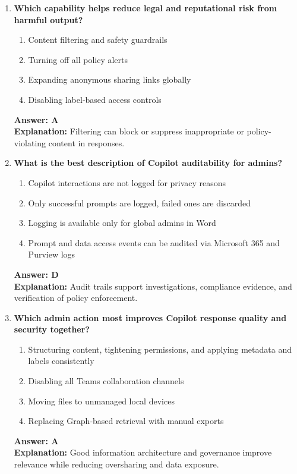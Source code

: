 \documentclass[10pt]{article}
\begin{document}
\begin{enumerate}[leftmargin=*]
\item \textbf{Which capability helps reduce legal and reputational risk from harmful output?}
\begin{enumerate}[label=\Alph*.]
  \item Content filtering and safety guardrails
  \item Turning off all policy alerts
  \item Expanding anonymous sharing links globally
  \item Disabling label-based access controls
\end{enumerate}
\textbf{Answer: A}\\
\textbf{Explanation:} Filtering can block or suppress inappropriate or policy-violating content in responses.

\item \textbf{What is the best description of Copilot auditability for admins?}
\begin{enumerate}[label=\Alph*.]
  \item Copilot interactions are not logged for privacy reasons
  \item Only successful prompts are logged, failed ones are discarded
  \item Logging is available only for global admins in Word
  \item Prompt and data access events can be audited via Microsoft 365 and Purview logs
\end{enumerate}
\textbf{Answer: D}\\
\textbf{Explanation:} Audit trails support investigations, compliance evidence, and verification of policy enforcement.

\item \textbf{Which admin action most improves Copilot response quality and security together?}
\begin{enumerate}[label=\Alph*.]
  \item Structuring content, tightening permissions, and applying metadata and labels consistently
  \item Disabling all Teams collaboration channels
  \item Moving files to unmanaged local devices
  \item Replacing Graph-based retrieval with manual exports
\end{enumerate}
\textbf{Answer: A}\\
\textbf{Explanation:} Good information architecture and governance improve relevance while reducing oversharing and data exposure.


\end{enumerate}
\end{document}
